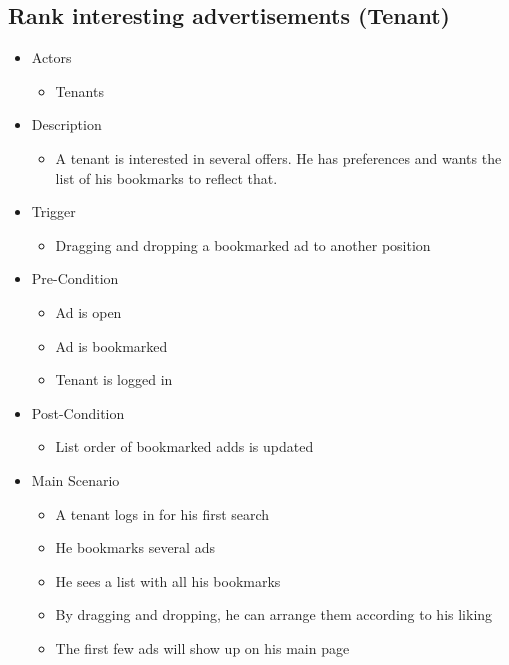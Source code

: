 \documentclass[a4paper,11pt]{article}
\begin{document}
\subsection*{Rank interesting advertisements (Tenant)}
\begin{itemize}
	\item Actors
		\begin{itemize}
			\item Tenants
		\end{itemize}
	\item Description
		\begin{itemize}
			\item A tenant is interested in several offers. He has preferences and wants the list of his bookmarks to reflect that.
		\end{itemize}
	\item Trigger
		\begin{itemize}
			\item Dragging and dropping a bookmarked ad to another position
		\end{itemize}
	\item Pre-Condition
		\begin{itemize}
			\item Ad is open
			\item Ad is bookmarked
			\item Tenant is logged in
		\end{itemize}
	\item Post-Condition
		\begin{itemize}
			\item List order of bookmarked adds is updated
		\end{itemize}
	\item Main Scenario
		\begin{itemize}
			\item A tenant logs in for his first search
			\item He bookmarks several ads
			\item He sees a list with all his bookmarks
			\item By dragging and dropping, he can arrange them according to his liking
			\item The first few ads will show up on his main page
		\end{itemize}
\end{itemize}
\end{document}
